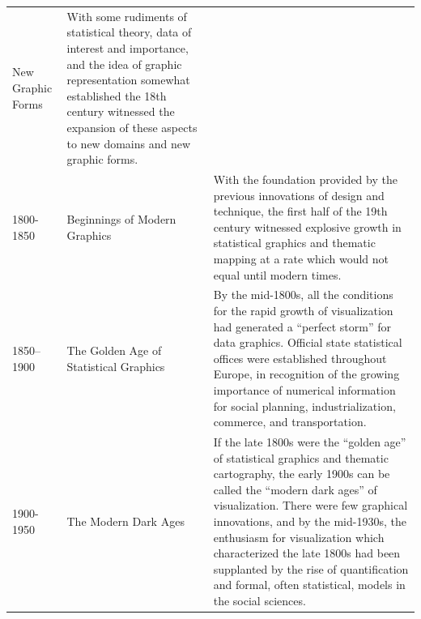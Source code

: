 \documentclass[]{book}
\begin{document}
\begin{longtable}[]{@{}lll@{}}
\begin{minipage}[t]{0.11\columnwidth}
New Graphic Forms\strut
\end{minipage} & \begin{minipage}[t]{0.69\columnwidth}\raggedright
With some rudiments of statistical theory, data of interest and importance, and the idea of graphic representation somewhat established the 18th century witnessed the expansion of these aspects to new domains and new graphic forms.\strut
\end{minipage}\tabularnewline
\begin{minipage}[t]{0.11\columnwidth}\raggedright
1800-1850\strut
\end{minipage} & \begin{minipage}[t]{0.11\columnwidth}\raggedright
Beginnings of Modern Graphics\strut
\end{minipage} & \begin{minipage}[t]{0.69\columnwidth}\raggedright
With the foundation provided by the previous innovations of design and technique, the first half of the 19th century witnessed explosive growth in statistical graphics and thematic mapping at a rate which would not equal until modern times.\strut
\end{minipage}\tabularnewline
\begin{minipage}[t]{0.11\columnwidth}\raggedright
1850--1900\strut
\end{minipage} & \begin{minipage}[t]{0.11\columnwidth}\raggedright
The Golden Age of Statistical Graphics\strut
\end{minipage} & \begin{minipage}[t]{0.69\columnwidth}\raggedright
By the mid-1800s, all the conditions for the rapid growth of visualization had generated a ``perfect storm'' for data graphics. Official state statistical offices were established throughout Europe, in recognition of the growing importance of numerical information for social planning, industrialization, commerce, and transportation.\strut
\end{minipage}\tabularnewline
\begin{minipage}[t]{0.11\columnwidth}\raggedright
1900-1950\strut
\end{minipage} & \begin{minipage}[t]{0.11\columnwidth}\raggedright
The Modern Dark Ages\strut
\end{minipage} & \begin{minipage}[t]{0.69\columnwidth}\raggedright
If the late 1800s were the ``golden age'' of statistical graphics and thematic cartography, the early 1900s can be called the ``modern dark ages'' of visualization. There were few graphical innovations, and by the mid-1930s, the enthusiasm for visualization which characterized the late 1800s had been supplanted by the rise of quantification and formal, often statistical, models in the social sciences.\strut

\end{minipage}
\end{longtable}
\end{document}
